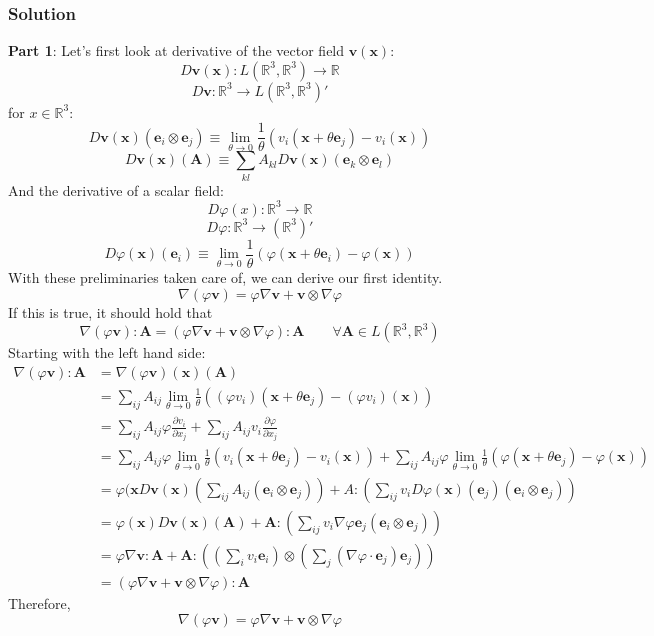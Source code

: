 \documentclass[letterpaper,10pt]{article}
\begin{document}
\subsubsection*{Solution}
\textbf{Part 1}:\newline
Let's first look at derivative of the vector field $\mathbf{v}(\mathbf{x})$:
\[
D\mathbf{v}(\mathbf{x}):L(\mathbb{R}^3,\mathbb{R}^3)\rightarrow\mathbb{R}
\]
\[
D\mathbf{v}:\mathbb{R}^3\rightarrow L(\mathbb{R}^3,\mathbb{R}
^3)'
\]
for $x\in\mathbb{R}^3$:
\[
D\mathbf{v}(\mathbf{x})(\mathbf{e}_i\otimes\mathbf{e}_j)\equiv
\lim_{\theta\rightarrow
0}\frac{1}{\theta}(v_i(\mathbf{x}+\theta\mathbf{e}_j)-v_i(\mathbf{x}))
\]
\[
D\mathbf{v}(\mathbf{x})(\mathbf{A})
\equiv\sum_{kl}A_{kl}D\mathbf{v}(\mathbf{x})(\mathbf{e}_k\otimes\mathbf
{e}_l)
\]
And the derivative of a scalar field:
\[
D\varphi(x):\mathbb{R}^3\rightarrow\mathbb{R}
\]
\[
D\varphi:\mathbb{R}^3\rightarrow(\mathbb{R}^3)'
\]
\[
D\varphi(\mathbf{x})(\mathbf{e}_i)
\equiv\lim_{\theta\rightarrow
0}\frac{1}{\theta}(\varphi(\mathbf{x}+\theta\mathbf{e}_i)-\varphi(\mathbf{x}))
\]
With these preliminaries taken care of, we can derive our first identity.
\[
\nabla(\varphi\mathbf{v})=\varphi\nabla\mathbf{v}+\mathbf{v}\otimes\nabla\varphi
\]
If this is true, it should hold that
\[
\nabla(\varphi\mathbf{v}):\mathbf{A}=(\varphi\nabla\mathbf{v}+\mathbf{v}
\otimes\nabla\varphi):\mathbf{A} \qquad \forall \mathbf{A}\in
L(\mathbb{R}^3,\mathbb{R}^3)
\]
Starting with the left hand side:
\begin{align*}
\nabla(\varphi\mathbf{v}):\mathbf{A}
&=\nabla(\varphi\mathbf{v})(\mathbf{x})(\mathbf{A})\\
&=\sum_{ij}A_{ij}\lim_{\theta\rightarrow 0}\frac{1}{\theta}((\varphi
v_i)(\mathbf{x}+\theta\mathbf{e}_j)-(\varphi v_i)(\mathbf{x}))\\
&=\sum_{ij}A_{ij}\varphi\frac{\partial v_i}{\partial x_j}
+\sum_{ij}A_{ij}v_i\frac{\partial\varphi}{\partial x_j}\\
&=\sum_{ij}A_{ij}\varphi\lim_{\theta\rightarrow
0}\frac{1}{\theta}(v_i(\mathbf{x}+\theta\mathbf{e}_j)-v_i(\mathbf{x}))
+\sum_{ij}A_{ij}\varphi\lim_{\theta\rightarrow
0}\frac{1}{\theta}(\varphi(\mathbf{x}+\theta\mathbf{e}_j)-\varphi(\mathbf{x}))\\
&=\varphi(\mathbf{x}D\mathbf{v}(\mathbf{x})\left(\sum_{ij}A_{ij}(\mathbf{e}
_i\otimes\mathbf{e}_j)\right)
+A:\left(\sum_{ij}v_iD\varphi(\mathbf{x})(\mathbf{e}_j)(\mathbf{e}
_i\otimes\mathbf{e}_j)\right)\\
&=\varphi(\mathbf{x})D\mathbf{v}(\mathbf{x})(\mathbf{A})
+\mathbf{A}:\left(\sum_{ij}v_i\nabla\varphi\mathbf{e}_j(\mathbf{e}
_i\otimes\mathbf{e}_j)\right)\\
&=\varphi\nabla\mathbf{v}:\mathbf{A}
+\mathbf{A}:\left((\sum_i
v_i\mathbf{e}_i)\otimes(\sum_j(\nabla\varphi\cdot\mathbf{e}_j)\mathbf{e}
_j)\right)\\
&=\left(\varphi\nabla\mathbf{v}+\mathbf{v}\otimes\nabla\varphi\right):\mathbf{A}
\end{align*}
Therefore,
\[
\nabla(\varphi\mathbf{v})=\varphi\nabla\mathbf{v}+\mathbf{v}\otimes\nabla\varphi
\]
\end{document}
